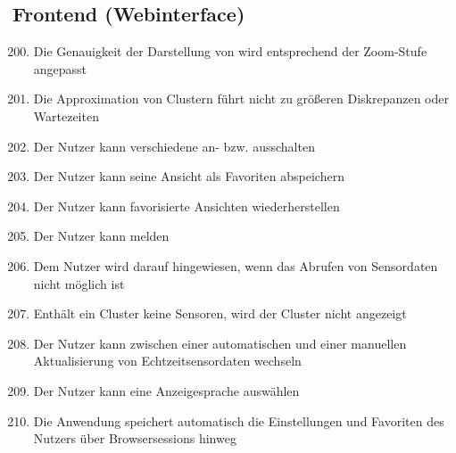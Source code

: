 \subsection{Frontend (Webinterface)}
\begin{enumerate}[label=\textbf{WK\arabic{enumi}0}]
	\setcounter{enumi}{199}
	\item Die Genauigkeit der Darstellung von  wird entsprechend der Zoom-Stufe angepasst %
	\item Die Approximation von Clustern führt nicht zu größeren Diskrepanzen oder Wartezeiten
	\item Der Nutzer kann verschiedene  an- bzw. ausschalten
	\item Der Nutzer kann seine Ansicht als Favoriten abspeichern
	\item Der Nutzer kann favorisierte Ansichten wiederherstellen
	\item Der Nutzer kann  melden
	\item Dem Nutzer wird darauf hingewiesen, wenn das Abrufen von Sensordaten nicht möglich ist
	\item Enthält ein Cluster keine Sensoren, wird der Cluster nicht angezeigt
	\item Der Nutzer kann zwischen einer automatischen und einer manuellen Aktualisierung von Echtzeitsensordaten wechseln
	\item Der Nutzer kann eine Anzeigesprache auswählen
	\item Die Anwendung speichert automatisch die Einstellungen und Favoriten des Nutzers über Browsersessions hinweg
\end{enumerate}

